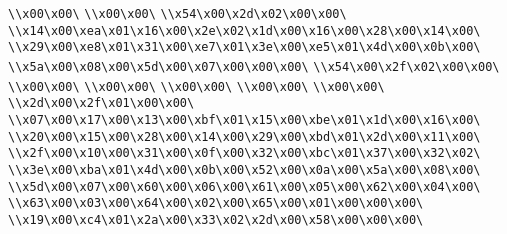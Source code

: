 \verb|\\x00\x00\|\newline
\verb|\\x00\x00\|\newline
\verb|\\x54\x00\x2d\x02\x00\x00\|\newline
\verb|\\x14\x00\xea\x01\x16\x00\x2e\x02\x1d\x00\x16\x00\x28\x00\x14\x00\|\newline
\verb|\\x29\x00\xe8\x01\x31\x00\xe7\x01\x3e\x00\xe5\x01\x4d\x00\x0b\x00\|\newline
\verb|\\x5a\x00\x08\x00\x5d\x00\x07\x00\x00\x00\|\newline
\verb|\\x54\x00\x2f\x02\x00\x00\|\newline
\verb|\\x00\x00\|\newline
\verb|\\x00\x00\|\newline
\verb|\\x00\x00\|\newline
\verb|\\x00\x00\|\newline
\verb|\\x00\x00\|\newline
\verb|\\x2d\x00\x2f\x01\x00\x00\|\newline
\verb|\\x07\x00\x17\x00\x13\x00\xbf\x01\x15\x00\xbe\x01\x1d\x00\x16\x00\|\newline
\verb|\\x20\x00\x15\x00\x28\x00\x14\x00\x29\x00\xbd\x01\x2d\x00\x11\x00\|\newline
\verb|\\x2f\x00\x10\x00\x31\x00\x0f\x00\x32\x00\xbc\x01\x37\x00\x32\x02\|\newline
\verb|\\x3e\x00\xba\x01\x4d\x00\x0b\x00\x52\x00\x0a\x00\x5a\x00\x08\x00\|\newline
\verb|\\x5d\x00\x07\x00\x60\x00\x06\x00\x61\x00\x05\x00\x62\x00\x04\x00\|\newline
\verb|\\x63\x00\x03\x00\x64\x00\x02\x00\x65\x00\x01\x00\x00\x00\|\newline
\verb|\\x19\x00\xc4\x01\x2a\x00\x33\x02\x2d\x00\x58\x00\x00\x00\|\newline
